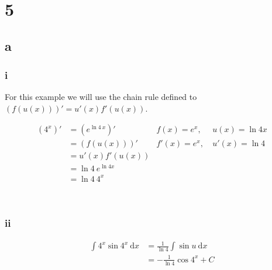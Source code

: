 \documentclass{article}
\newcommand{\md}{~\mathrm d}
\newcommand{\blankpage}{
    \newpage
    \
    \newpage
}
\begin{document}




\blankpage
\section{5}
\subsection{a}
\subsubsection{i}

For this example we will use the chain rule defined to $(f(u(x)))' = u'(x) f'(u(x))$.

\begin{align*}
    (4^x)' &= (e^{\ln 4 ~ x})' & f(x) = e^x, &~ u(x) = \ln 4 x \\
           &= (f(u(x)))' & f'(x) = e^x,&~ u'(x) = \ln 4 \\
           &= u'(x)f'(u(x)) \\
           &= \ln 4 ~ e^{\ln 4 x} \\
           &= \ln 4~4^x
\end{align*}

\blankpage
\subsubsection{ii}

\begin{align*}
    \int 4^x \sin 4^x \md x &= \frac 1 {\ln 4}\int \sin u \md x \\
                            &= -\frac 1 {\ln 4} \cos 4^x + C
\end{align*}
\end{document}
